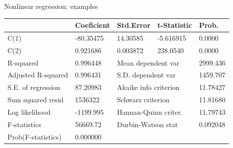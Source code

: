 \documentclass{beamer}
\begin{document}
\begin{frame}{Nonlinear regression: examples}
\begin{table}[]
\begin{tabular}{@{}lllll@{}}
                                                           & Coeficient                                         & Std.Error                                         & t-Statistic                                        & Prob.                                           \\
\midrule
C(1)                                                       & -80.35475                                          & 14.30585                                          & -5.616915                                          & 0.0000                                          \\
C(2)                                                       & 0.921686                                           & 0.003872                                          & 238.0540                                           & 0.0000 
\\ \midrule
R-squared                                                  & 0.996448                                           & \multicolumn{2}{l}{Mean dependent var}                                                                 & 2999.436                                        \\
Adjusted R-squared                                         & 0.996431                                           & \multicolumn{2}{l}{S.D. dependent var}                                                                 & 1459.707                                        \\
S.E. of regression                                         & 87.20983                                           & \multicolumn{2}{l}{Akaike info criterion}                                                              & 11.78427                                        \\
Sum squared resid                                          & 1536322                                            & \multicolumn{2}{l}{Schwarz criterion}                                                                  & 11.81680                                        \\
Log likelihood                                             & -1199.995                                          & \multicolumn{2}{l}{Hannan-Quinn criter.}                                                               & 11.79743                                        \\
F-statistics                                               & 56669.72                                           & \multicolumn{2}{l}{Durbin-Watson stat}                                                                 & 0.092048                                        \\
Prob(F-statistics)                                         & 0.000000                                           & \multicolumn{2}{l}{}                                                                                   &                                                 \\ \bottomrule
\end{tabular}
\end{table}
\end{frame}
\end{document}
